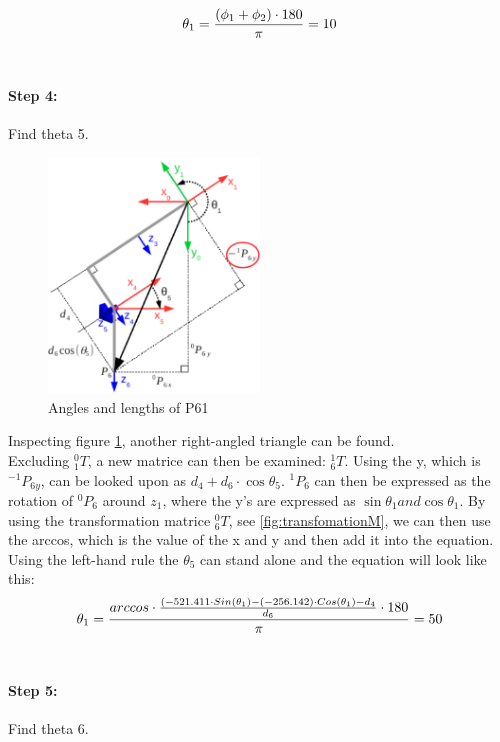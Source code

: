 \begin{equation}
\centering
\theta_1 = \frac{(\phi_1+\phi_2)\cdot180}{\pi} = 10
\end{equation}\\


\paragraph{Step 4:} Find theta 5.\\
\begin{figure}[H]
    \centering
    \includegraphics[width=0.5\textwidth]{Design/06.png}
    \caption{Angles and lengths of P61 \cite{Rasmus}} 
    \label{fig:rasmus2} 
\end{figure}

Inspecting figure \ref{fig:rasmus2}, another right-angled triangle can be found.\\
Excluding $_1^0T$, a new matrice can then be examined: $_6^1T$. 
Using the y, which is $^{-1}P_{6y}$, can be looked upon as $d_4+d_6\cdot\cos{\theta_5}$.
$^1P_6$ can then be expressed as the rotation of $^0P_6$ around $z_1$, where the y's are expressed as $\sin{\theta_1}and\cos{\theta_1}$.
By using the transformation matrice $_6^0T$, see \ref{fig:transfomationM}, we can then use the arccos, which is the value of the x and y and then add it into the equation.\\
Using the left-hand rule the $\theta_5$ can stand alone and the equation will look like this:
\begin{equation}
\centering
\large\theta_1 =\frac{arccos\cdot\frac{(-521.411\cdot Sin(\theta_1)-(-256.142)\cdot Cos(\theta_1)-d_4}{d_6}\cdot 180}{\pi}=50
\end{equation}\\


\paragraph{Step 5:} Find theta 6.\\

